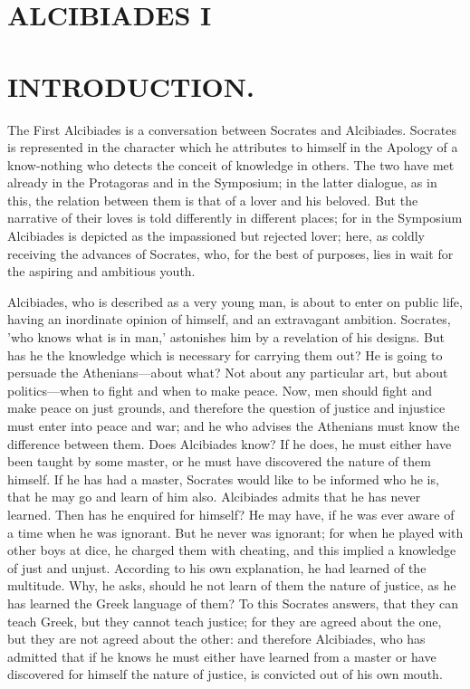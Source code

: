\documentclass[11pt,letter]{article}
\begin{document}
\par 

\par 
\section{
      ALCIBIADES I
    }
\par 
\section{
      INTRODUCTION.
    }
\par  The First Alcibiades is a conversation between Socrates and Alcibiades. Socrates is represented in the character which he attributes to himself in the Apology of a know-nothing who detects the conceit of knowledge in others. The two have met already in the Protagoras and in the Symposium; in the latter dialogue, as in this, the relation between them is that of a lover and his beloved. But the narrative of their loves is told differently in different places; for in the Symposium Alcibiades is depicted as the impassioned but rejected lover; here, as coldly receiving the advances of Socrates, who, for the best of purposes, lies in wait for the aspiring and ambitious youth.

\par  Alcibiades, who is described as a very young man, is about to enter on public life, having an inordinate opinion of himself, and an extravagant ambition. Socrates, 'who knows what is in man,' astonishes him by a revelation of his designs. But has he the knowledge which is necessary for carrying them out? He is going to persuade the Athenians—about what? Not about any particular art, but about politics—when to fight and when to make peace. Now, men should fight and make peace on just grounds, and therefore the question of justice and injustice must enter into peace and war; and he who advises the Athenians must know the difference between them. Does Alcibiades know? If he does, he must either have been taught by some master, or he must have discovered the nature of them himself. If he has had a master, Socrates would like to be informed who he is, that he may go and learn of him also. Alcibiades admits that he has never learned. Then has he enquired for himself? He may have, if he was ever aware of a time when he was ignorant. But he never was ignorant; for when he played with other boys at dice, he charged them with cheating, and this implied a knowledge of just and unjust. According to his own explanation, he had learned of the multitude. Why, he asks, should he not learn of them the nature of justice, as he has learned the Greek language of them? To this Socrates answers, that they can teach Greek, but they cannot teach justice; for they are agreed about the one, but they are not agreed about the other: and therefore Alcibiades, who has admitted that if he knows he must either have learned from a master or have discovered for himself the nature of justice, is convicted out of his own mouth.
\end{document}
